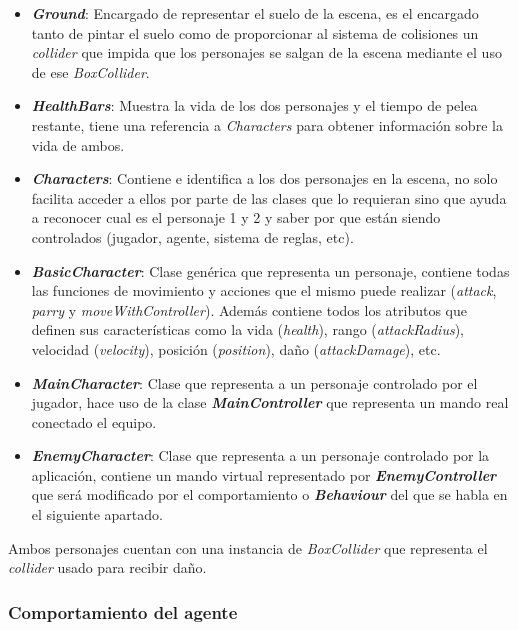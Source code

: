 \begin{itemize}
	\item \textbf{\textit{Ground}}: Encargado de representar el suelo de la escena, es el encargado tanto de pintar el suelo como de proporcionar al sistema de colisiones un \textit{collider} que impida que los personajes se salgan de la escena mediante el uso de ese \textit{BoxCollider}.
	\item \textbf{\textit{HealthBars}}: Muestra la vida de los dos personajes y el tiempo de pelea restante, tiene una referencia a \textit{Characters} para obtener información sobre la vida de ambos.
	\item \textbf{\textit{Characters}}: Contiene e identifica a los dos personajes en la escena, no solo facilita acceder a ellos por parte de las clases que lo requieran sino que ayuda a reconocer cual es el personaje 1 y 2 y saber por que están siendo controlados (jugador, agente, sistema de reglas, etc).
	\item \textbf{\textit{BasicCharacter}}: Clase genérica que representa un personaje, contiene todas las funciones de movimiento y acciones que el mismo puede realizar (\textit{attack}, \textit{parry} y \textit{moveWithController}). Además contiene todos los atributos que definen sus características como la vida (\textit{health}), rango (\textit{attackRadius}), velocidad (\textit{velocity}), posición (\textit{position}), daño (\textit{attackDamage}), etc. 
	\item \textbf{\textit{MainCharacter}}: Clase que representa a un personaje controlado por el jugador, hace uso de la clase \textbf{\textit{MainController}} que representa un mando real conectado el equipo.
	\item \textbf{\textit{EnemyCharacter}}: Clase que representa a un personaje controlado por la aplicación, contiene un mando virtual representado por \textbf{\textit{EnemyController}} que será modificado por el comportamiento o \textbf{\textit{Behaviour}} del que se habla en el siguiente apartado.
\end{itemize}

\bigskip

Ambos personajes cuentan con una instancia de \textit{BoxCollider} que representa el \textit{collider} usado para recibir daño.

\subsubsection*{Comportamiento del agente}

